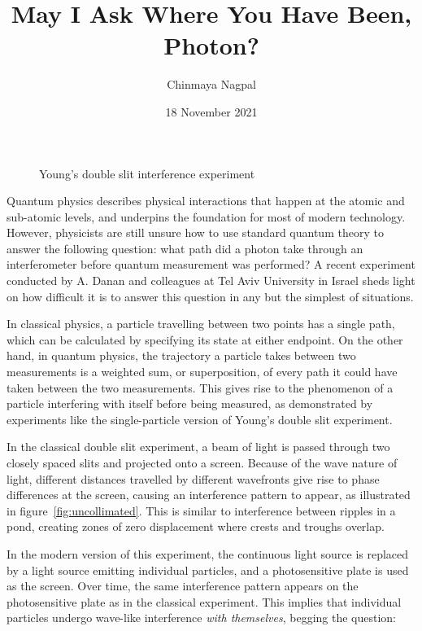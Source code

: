 \documentclass{article}
\author{Chinmaya Nagpal}
\title{May I Ask Where You Have Been, Photon?}
\date{18 November 2021}
\begin{document}
\maketitle

\begin{figure}[ht]
	\hspace*{\fill}
	\caption{Young's double slit interference experiment}
	\label{fig:double-slit}
\end{figure}

Quantum physics describes physical interactions that happen at the atomic and
sub-atomic levels, and underpins the foundation for most of modern technology.
However, physicists are still unsure how to use standard quantum theory to 
answer the following question: what path did a photon take through an 
interferometer before quantum measurement was performed?  A recent experiment 
conducted by A. Danan and colleagues at Tel Aviv University in Israel sheds 
light on how difficult it is to answer this question in any but the simplest of 
situations. 

In classical physics, a particle travelling between two points has a single
path, which can be calculated by specifying its state at either endpoint. On 
the other hand, in quantum physics, the trajectory a particle takes between two 
measurements is a weighted sum, or superposition, of every path it could have 
taken between the two measurements. This gives rise to the phenomenon of a 
particle interfering with itself before being measured, as demonstrated by 
experiments like the single-particle version of Young's double slit experiment. 

In the classical double slit experiment, a beam of light is passed through two 
closely spaced slits and projected onto a screen. Because of the wave nature of 
light, different distances travelled by different wavefronts give rise to phase 
differences at the screen, causing an interference pattern to appear, as 
illustrated in figure~\ref{fig:uncollimated}. This is similar to interference 
between ripples in a pond, creating zones of zero displacement where crests and 
troughs overlap. 

In the modern version of this experiment, the continuous light source is 
replaced by a light source emitting individual particles, and a photosensitive 
plate is used as the screen. Over time, the same interference pattern appears 
on the photosensitive plate as in the classical experiment. This implies that 
individual particles undergo wave-like interference \textit{with themselves}, 
begging the question: 
\end{document}
